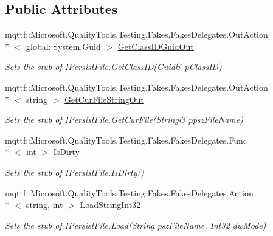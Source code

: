 \subsection*{Public Attributes}
\begin{DoxyCompactItemize}
\item 
mqttf\-::\-Microsoft.\-Quality\-Tools.\-Testing.\-Fakes.\-Fakes\-Delegates.\-Out\-Action\\*
$<$ global\-::\-System.\-Guid $>$ \hyperlink{class_system_1_1_runtime_1_1_interop_services_1_1_com_types_1_1_fakes_1_1_stub_i_persist_file_ab9f36122f62a5495cd82ee8480b2326e}{Get\-Class\-I\-D\-Guid\-Out}
\begin{DoxyCompactList}\small\item\em Sets the stub of I\-Persist\-File.\-Get\-Class\-I\-D(Guid\& p\-Class\-I\-D)\end{DoxyCompactList}\item 
mqttf\-::\-Microsoft.\-Quality\-Tools.\-Testing.\-Fakes.\-Fakes\-Delegates.\-Out\-Action\\*
$<$ string $>$ \hyperlink{class_system_1_1_runtime_1_1_interop_services_1_1_com_types_1_1_fakes_1_1_stub_i_persist_file_a521c3581ffbe512fd104f74f444f4ad9}{Get\-Cur\-File\-String\-Out}
\begin{DoxyCompactList}\small\item\em Sets the stub of I\-Persist\-File.\-Get\-Cur\-File(String\& ppsz\-File\-Name)\end{DoxyCompactList}\item 
mqttf\-::\-Microsoft.\-Quality\-Tools.\-Testing.\-Fakes.\-Fakes\-Delegates.\-Func\\*
$<$ int $>$ \hyperlink{class_system_1_1_runtime_1_1_interop_services_1_1_com_types_1_1_fakes_1_1_stub_i_persist_file_a4d28a83abbb6c7111be2037ad264dc5d}{Is\-Dirty}
\begin{DoxyCompactList}\small\item\em Sets the stub of I\-Persist\-File.\-Is\-Dirty()\end{DoxyCompactList}\item 
mqttf\-::\-Microsoft.\-Quality\-Tools.\-Testing.\-Fakes.\-Fakes\-Delegates.\-Action\\*
$<$ string, int $>$ \hyperlink{class_system_1_1_runtime_1_1_interop_services_1_1_com_types_1_1_fakes_1_1_stub_i_persist_file_a04321a6dcc12776e0e9f31afbc2bb676}{Load\-String\-Int32}
\begin{DoxyCompactList}\small\item\em Sets the stub of I\-Persist\-File.\-Load(\-String psz\-File\-Name, Int32 dw\-Mode)\end{DoxyCompactList}\item 

\end{DoxyCompactItemize}
